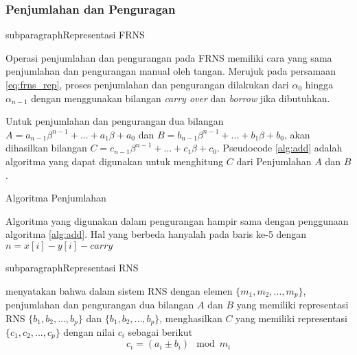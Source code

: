     \subsubsection{Penjumlahan dan Penguragan} \label{sec:add_sub_theory}
      subparagraph{Representasi FRNS}

      Operasi penjumlahan dan pengurangan pada FRNS memiliki cara yang sama penjumlahan dan pengurangan manual oleh tangan. Merujuk pada persamaan \ref{eq:frns_rep}, proses penjumlahan dan pengurangan dilakukan dari $\alpha_0$ hingga $\alpha_{n-1}$ dengan menggunakan bilangan \textit{carry over} dan \textit{borrow} jika dibutuhkan.

      Untuk penjumlahan dan pengurangan dua bilangan $A = a_{n-1}\beta^{n-1}+...+a_{1}\beta+a_{0}$ dan $B = b_{n-1}\beta^{n-1}+...+b_{1}\beta+b_{0}$, akan dihasilkan bilangan $C = c_{n-1}\beta^{n-1}+...+c_{1}\beta+c_{0}$. Pseudocode \ref{alg:add} adalah algoritma yang dapat digunakan untuk menghitung $C$ dari Penjumlahan $A$ dan $B$.

      \begin{algorithm}
        \caption{Algoritma Penjumlahan}
        \label{alg:add}
        \begin{algorithmic}[1]
          \Statex
          \EndFor
          \State {}
          \EndFunction
        \end{algorithmic}
      \end{algorithm}

      Algoritma yang digunakan dalam pengurangan hampir sama dengan penggunaan algoritma \ref{alg:add}. Hal yang berbeda hanyalah pada baris ke-5 dengan $n = x[i] - y[i] - carry $

      subparagraph{Representasi RNS}

      \citet{rns_sharoun} menyatakan bahwa dalam sistem RNS dengan elemen $\{m_1,m_2,...,m_p\}$, penjumlahan dan pengurangan dua bilangan $A$ dan $B$ yang memiliki representasi RNS $\{b_1,b_2,...,b_p\}$ dan $\{b_1,b_2,...,b_p\}$,  menghasilkan $C$ yang memiliki representasi $\{c_1,c_2,...,c_p\}$ dengan nilai $c_i$ sebagai berikut
      \begin{equation}
        c_i = (a_i \pm b_i) \mod m_i
      \end{equation}



